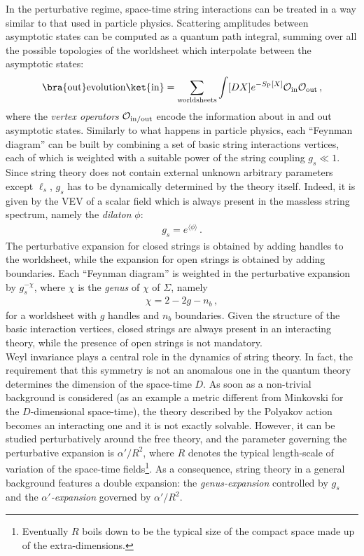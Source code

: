 \documentclass[12pt,a4paper]{book}
\begin{document}
In the perturbative regime, space-time string interactions can be treated in a way similar to that used in particle physics. Scattering amplitudes between asymptotic states can be computed as a quantum path integral, summing over all the possible topologies of the worldsheet which interpolate between the asymptotic states:
\begin{align}
\label{eq:ScatteringAmplitude}
\bra{\text{out}} \text{evolution} \ket{\text{in}} = \sum_{\text{worldsheets}} \int [D X] e^{-S_{\rm P}[X]} \mathcal{O}_{\rm in} \mathcal{O}_{\rm out} \,,
\end{align}
where the \textit{vertex operators} $\mathcal{O}_{\rm in/out}$ encode the information about in and out asymptotic states. Similarly to what happens in particle physics, each ``Feynman diagram'' can be built by combining a set of basic string interactions vertices, each of which is weighted with a suitable power of the string coupling $g_s \ll 1$. Since string theory does not contain external unknown arbitrary parameters except $\ell_s$, $g_s$ has to be dynamically determined by the theory itself. Indeed, it is given by the VEV of a scalar field which is always present in the massless string spectrum, namely the \textit{dilaton} $\phi$:
\begin{align}	
\label{eq:StringCouplingConstant}
g_s = e^{\langle\phi\rangle}\,.
\end{align}
The perturbative expansion for closed strings is obtained by adding handles to the worldsheet, while the expansion for open strings is obtained by adding boundaries. Each ``Feynman diagram'' is weighted in the perturbative expansion by $g_s^{-\chi}$, where $\chi$ is the \textit{genus} of $\chi$ of $\Sigma$, namely
\begin{align}
\label{eq:Euler}
\chi = 2 - 2 g - n_b\,,
\end{align}
for a worldsheet with $g$ handles and $n_b$ boundaries. Given the structure of the basic interaction vertices, closed strings are always present in an interacting theory, while the presence of open strings is not mandatory.\\

Weyl invariance plays a central role in the dynamics of string theory. In fact, the requirement that this symmetry is not an anomalous one in the quantum theory determines the dimension of the space-time $D$. As soon as a non-trivial background is considered (as an example a metric different from Minkovski for the $D$-dimensional space-time), the theory described by the Polyakov action becomes an interacting one and it is not exactly solvable. However, it can be studied perturbatively around the free theory, and the parameter governing the perturbative expansion is $\alpha'/R^2$, where $R$ denotes the typical length-scale of variation of the space-time fields\footnote{Eventually $R$ boils down to be the typical size of the compact space made up of the extra-dimensions.}. As a consequence, string theory in a general background features a double expansion: the \textit{genus-expansion} controlled by $g_s$ and the $\alpha'$\textit{-expansion} governed by $\alpha'/R^2$.
\end{document}
